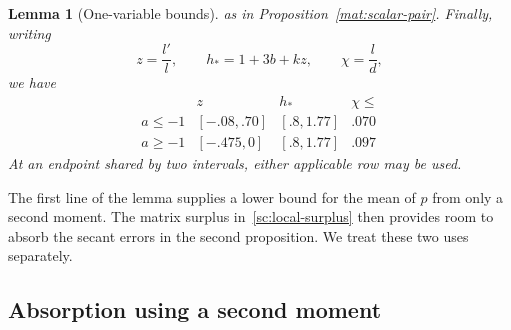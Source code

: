 \documentclass[11pt]{article}
\newtheorem{lemma}[theorem]{Lemma}
\theoremstyle{definition}
\theoremstyle{remark}
\numberwithin{equation}{section}
\begin{document}
\begin{lemma}[One-variable bounds]
as in Proposition~\ref{mat:scalar-pair}.
Finally, writing
\begin{equation}\label{sc:derivative-functions}
 z=\frac{l'}{l},\qquad h_*=1+3b+kz,\qquad \chi=\frac{l}{d},
\end{equation}
we have
\begin{equation}\label{sc:derivative-table}
\begin{array}{c|ccc}
 &z&h_*&\chi\le\\\hline
 a\le-1&[-.08,.70]&[.8,1.77]&.070\\
 a\ge-1&[-.475,0]&[.8,1.77]&.097
\end{array}
\end{equation}
At an endpoint shared by two intervals, either applicable row may be used.
\end{lemma}

The first line of the lemma supplies a lower bound for the mean of $p$ from
only a second moment.  The matrix surplus in~\eqref{sc:local-surplus}
then provides room to absorb the secant errors in the second proposition.
We treat these two uses separately.

\subsection{Absorption using a second moment}\label{sc:absorption-proof}
\end{document}

